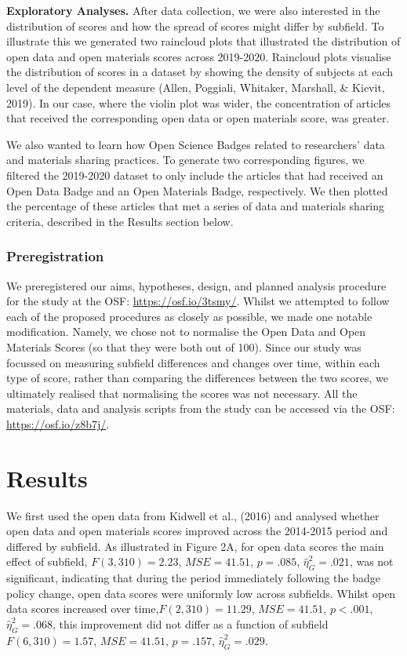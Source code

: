 \documentclass[
  english,
  man,floatsintext]{apa6}
\begin{document}
\textbf{Exploratory Analyses.} After data collection, we were also interested in the distribution of scores and how the spread of scores might differ by subfield. To illustrate this we generated two raincloud plots that illustrated the distribution of open data and open materials scores across 2019-2020. Raincloud plots visualise the distribution of scores in a dataset by showing the density of subjects at each level of the dependent measure (Allen, Poggiali, Whitaker, Marshall, \& Kievit, 2019). In our case, where the violin plot was wider, the concentration of articles that received the corresponding open data or open materials score, was greater.

We also wanted to learn how Open Science Badges related to researchers' data and materials sharing practices. To generate two corresponding figures, we filtered the 2019-2020 dataset to only include the articles that had received an Open Data Badge and an Open Materials Badge, respectively. We then plotted the percentage of these articles that met a series of data and materials sharing criteria, described in the Results section below.

\hypertarget{preregistration}{%
\subsubsection{Preregistration}\label{preregistration}}

We preregistered our aims, hypotheses, design, and planned analysis procedure for the study at the OSF: \url{https://osf.io/3tsmy/}. Whilst we attempted to follow each of the proposed procedures as closely as possible, we made one notable modification. Namely, we chose not to normalise the Open Data and Open Materials Scores (so that they were both out of 100). Since our study was focussed on measuring subfield differences and changes over time, within each type of score, rather than comparing the differences between the two scores, we ultimately realised that normalising the scores was not necessary. All the materials, data and analysis scripts from the study can be accessed via the OSF: \url{https://osf.io/z8b7j/}.

\hypertarget{results}{%
\section{Results}\label{results}}

We first used the open data from Kidwell et al., (2016) and analysed whether open data and open materials scores improved across the 2014-2015 period and differed by subfield. As illustrated in Figure 2A, for open data scores the main effect of subfield, \(F(3, 310) = 2.23\), \(\mathit{MSE} = 41.51\), \(p = .085\), \(\hat{\eta}^2_G = .021\), was not significant, indicating that during the period immediately following the badge policy change, open data scores were uniformly low across subfields. Whilst open data scores increased over time,\(F(2, 310) = 11.29\), \(\mathit{MSE} = 41.51\), \(p < .001\), \(\hat{\eta}^2_G = .068\), this improvement did not differ as a function of subfield \(F(6, 310) = 1.57\), \(\mathit{MSE} = 41.51\), \(p = .157\), \(\hat{\eta}^2_G = .029\).
\end{document}
